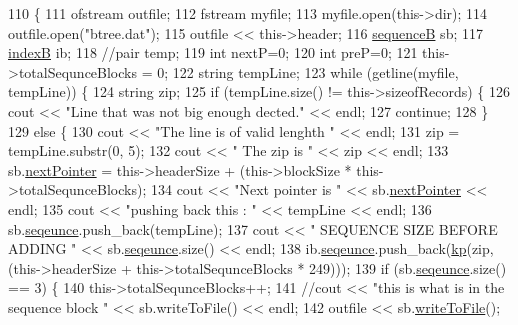 \begin{DoxyCode}
110                                \{
111     ofstream outfile;
112     fstream myfile;
113     myfile.open(this->dir);
114     outfile.open(\textcolor{stringliteral}{"btree.dat"});
115     outfile << this->header;
116     \mbox{\hyperlink{structsequence_b}{sequenceB}} sb;
117     \mbox{\hyperlink{structindex_b}{indexB}} ib;
118     \textcolor{comment}{//pair temp;}
119     \textcolor{keywordtype}{int} nextP=0;
120     \textcolor{keywordtype}{int} preP=0;
121     this->totalSequnceBlocks = 0;
122     \textcolor{keywordtype}{string} tempLine;
123     \textcolor{keywordflow}{while} (getline(myfile, tempLine)) \{
124         \textcolor{keywordtype}{string} zip;
125         \textcolor{keywordflow}{if} (tempLine.size() != this->sizeofRecords) \{
126             cout << \textcolor{stringliteral}{"Line that was not big enough dected."} << endl;
127             \textcolor{keywordflow}{continue};
128         \}
129         \textcolor{keywordflow}{else} \{
130             cout << \textcolor{stringliteral}{"The line is of valid lenghth "} << endl;
131             zip = tempLine.substr(0, 5);
132             cout << \textcolor{stringliteral}{" The zip is "} << zip << endl;
133             sb.\mbox{\hyperlink{structsequence_b_a7fc2afa4a31d852ecaae7d0b6733ad7e}{nextPointer}} = this->headerSize + (this->blockSize * this->totalSequnceBlocks);
134             cout << \textcolor{stringliteral}{"Next pointer is "} << sb.\mbox{\hyperlink{structsequence_b_a7fc2afa4a31d852ecaae7d0b6733ad7e}{nextPointer}} << endl;
135             cout << \textcolor{stringliteral}{"pushing back this : "} << tempLine << endl;
136             sb.\mbox{\hyperlink{structsequence_b_a4cb5526b3901d3a3348447bee4e7f623}{seqeunce}}.push\_back(tempLine);
137             cout << \textcolor{stringliteral}{" SEQUENCE SIZE BEFORE ADDING "} << sb.\mbox{\hyperlink{structsequence_b_a4cb5526b3901d3a3348447bee4e7f623}{seqeunce}}.size() << endl;
138             ib.\mbox{\hyperlink{structindex_b_a2d8b28953bea6e6bdc221993ef60864a}{seqeunce}}.push\_back(\mbox{\hyperlink{structkp}{kp}}(zip, (this->headerSize + this->totalSequnceBlocks * 249)));
139             \textcolor{keywordflow}{if} (sb.\mbox{\hyperlink{structsequence_b_a4cb5526b3901d3a3348447bee4e7f623}{seqeunce}}.size() == 3) \{
140                 this->totalSequnceBlocks++;
141                 \textcolor{comment}{//cout << "this is what is in the sequence block " << sb.writeToFile() << endl;}
142                 outfile << sb.\mbox{\hyperlink{structsequence_b_a4ac2a92234d1686dc5cbbaf9ebc1d304}{writeToFile}}();

\end{DoxyCode}
